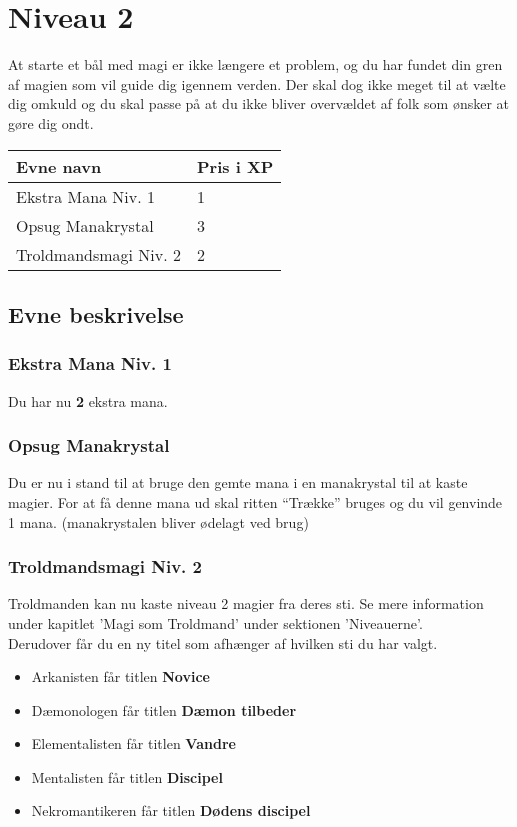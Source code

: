 \chapter*{Niveau 2}
At starte et bål med magi er ikke længere et problem, og du har fundet din gren af magien som vil guide dig igennem verden. Der skal dog ikke meget til at vælte dig omkuld og du skal passe på at du ikke bliver overvældet af folk som ønsker at gøre dig ondt.

\begin{table}[H]
    \centering
    \begin{tabular}{|p{}|p{}|}
    \rowcolor{cerulean!80}\hline
    Evne navn & Pris i XP \\\hline
        Ekstra Mana Niv. 1 & 1 \\\hline
        Opsug Manakrystal & 3\\\hline
        Troldmandsmagi Niv. 2 & 2\\\hline
    \end{tabular}
\end{table}
\section*{Evne beskrivelse}

\subsection*{Ekstra Mana Niv. 1} 
Du har nu \textbf{2} ekstra mana.

\subsection*{Opsug Manakrystal}
Du er nu i stand til at bruge den gemte mana i en manakrystal til at kaste magier. For at få denne mana ud skal ritten “Trække” bruges og du vil genvinde 1 mana. (manakrystalen bliver ødelagt ved brug)

\subsection*{Troldmandsmagi Niv. 2}
Troldmanden kan nu kaste niveau 2 magier fra deres sti. Se mere information under kapitlet 'Magi som Troldmand' under sektionen 'Niveauerne'. \\
Derudover får du en ny titel som afhænger af hvilken sti du har valgt.\\
\begin{itemize}
    \item Arkanisten får titlen \textbf{Novice}
    \item Dæmonologen får titlen \textbf{Dæmon tilbeder}
    \item Elementalisten får titlen \textbf{Vandre}
    \item Mentalisten får titlen \textbf{Discipel}
    \item Nekromantikeren får titlen \textbf{Dødens discipel}
\end{itemize}
